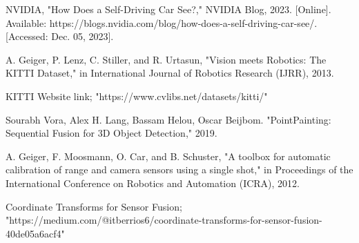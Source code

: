 \documentclass[letterpaper, 10 pt, conference]{ieeeconf}  %
\begin{document}





\begin{thebibliography}{99}

 NVIDIA, "How Does a Self-Driving Car See?," NVIDIA Blog, 2023. [Online]. Available: https://blogs.nvidia.com/blog/how-does-a-self-driving-car-see/. [Accessed: Dec. 05, 2023].

 A. Geiger, P. Lenz, C. Stiller, and R. Urtasun, "Vision meets Robotics: The KITTI Dataset," in International Journal of Robotics Research (IJRR), 2013.

 KITTI Website link; "https://www.cvlibs.net/datasets/kitti/"

 Sourabh Vora, Alex H. Lang, Bassam Helou, Oscar Beijbom. "PointPainting: Sequential Fusion for 3D Object Detection," 2019.

 A. Geiger, F. Moosmann, O. Car, and B. Schuster, "A toolbox for automatic calibration of range and camera sensors using a single shot," in Proceedings of the International Conference on Robotics and Automation (ICRA), 2012.

 Coordinate Transforms for Sensor Fusion; "https://medium.com/@itberrios6/coordinate-transforms-for-sensor-fusion-40de05a6acf4"


\end{thebibliography}
\end{document}
